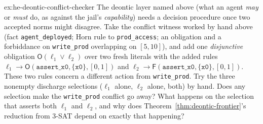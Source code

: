 \documentclass[11pt,a4paper]{article}
\theoremstyle{definition}
\theoremstyle{definition}
\theoremstyle{remark}
\begin{document}


\begin{pdexercise}[kind=Trace,rating=2]{ex:he-deontic-conflict-checker}
The deontic layer named above (what an agent \emph{may} or \emph{must} do,
as against the jail's \emph{capability}) needs a decision procedure once two
accepted norms might disagree. Take the conflict witness worked by hand above
(fact \texttt{agent\_deployed}; Horn rule to \texttt{prod\_access}; an obligation
and a forbiddance on \texttt{write\_prod} overlapping on $[5,10]$), and add one
\emph{disjunctive} obligation $\mathsf O(\ell_1\vee\ell_2)$ over two fresh literals
with the added rules $\ell_1\to \mathsf O(\texttt{assert\_x0},\{\texttt{x0}\},[0,1])$
and $\ell_2\to \mathsf F(\texttt{assert\_x0},\{\texttt{x0}\},[0,1])$.
These two rules concern a different action from \texttt{write\_prod}.
Try the three nonempty discharge selections ($\ell_1$ alone, $\ell_2$ alone,
both) by hand. Does any selection make the \texttt{write\_prod} conflict go
away? What happens on the selection that asserts both $\ell_1$ and $\ell_2$, and
why does Theorem~\ref{thm:deontic-frontier}'s reduction from 3-SAT depend on exactly that happening?
\end{pdexercise}
\end{document}
